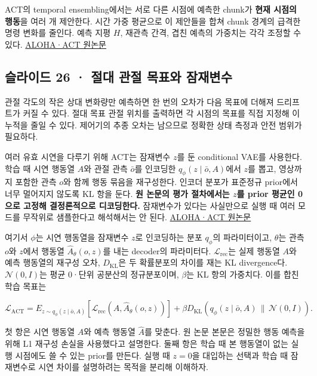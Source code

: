 \documentclass[11pt,a4paper]{article}
\begin{document}
ACT의 temporal ensembling에서는 서로 다른 시점에 예측한 chunk가 \textbf{현재 시점의 행동}을 여러 개 제안한다. 시간 가중 평균으로 이 제안들을 합쳐 chunk 경계의 급격한 명령 변화를 줄인다. 예측 지평 $H$, 재관측 간격, 겹친 예측의 가중치는 각각 조정할 수 있다. \href{https://arxiv.org/abs/2304.13705}{ALOHA·ACT 원논문}\par

\subsection{슬라이드 26 · 절대 관절 목표와 잠재변수}

관절 각도의 작은 상대 변화량만 예측하면 한 번의 오차가 다음 목표에 더해져 드리프트가 커질 수 있다. 절대 목표 관절 위치를 출력하면 각 시점의 목표를 직접 지정해 이 누적을 줄일 수 있다. 제어기의 추종 오차는 남으므로 정확한 상태 측정과 안전 범위가 필요하다.\par

여러 유효 시연을 다루기 위해 ACT는 잠재변수 $z$를 둔 conditional VAE를 사용한다. 학습 때 시연 행동열 $A$와 관절 관측 $\bar o$를 인코딩한 $q_\phi(z\mid\bar o,A)$에서 $z$를 뽑고, 영상까지 포함한 관측 $o$와 함께 행동 묶음을 재구성한다. 인코더 분포가 표준정규 prior에서 너무 멀어지지 않도록 KL 항을 둔다. \textbf{원 논문의 평가 절차에서는 $z$를 prior 평균인 0으로 고정해 결정론적으로 디코딩한다.} 잠재변수가 있다는 사실만으로 실행 때 여러 모드를 무작위로 샘플한다고 해석해서는 안 된다. \href{https://arxiv.org/abs/2304.13705}{ALOHA·ACT 원논문}\par

여기서 $\phi$는 시연 행동열을 잠재변수 $z$로 인코딩하는 분포 $q_\phi$의 파라미터이고, $\theta$는 관측 $o$와 $z$에서 행동열 $\widehat A_\theta(o,z)$를 내는 decoder의 파라미터다. $\mathcal L_{\mathrm{rec}}$는 실제 행동열 $A$와 예측 행동열의 재구성 오차, $D_{\mathrm{KL}}$은 두 확률분포의 차이를 재는 KL divergence다. $\mathcal N(0,I)$는 평균 0·단위 공분산의 정규분포이며, $\beta$는 KL 항의 가중치다. 이를 합친 학습 목표는\par

\[
\mathcal L_{\mathrm{ACT}}=E_{z\sim q_\phi(z\mid\bar o,A)}
[\mathcal L_{\mathrm{rec}}(A,\widehat A_\theta(o,z))]
+\beta D_{\mathrm{KL}}\!\left(q_\phi(z\mid\bar o,A)\,\|\,\mathcal N(0,I)\right).
\]

첫 항은 시연 행동열 $A$와 예측 행동열 $\widehat A$를 맞춘다. 원 논문 본문은 정밀한 행동 예측을 위해 L1 재구성 손실을 사용했다고 설명한다. 둘째 항은 학습 때 본 행동열이 없는 실행 시점에도 쓸 수 있는 prior를 만든다. 실행 때 $z=0$을 대입하는 선택과 학습 때 잠재변수로 시연 차이를 설명하려는 목적을 분리해 이해하자.\par
\end{document}
